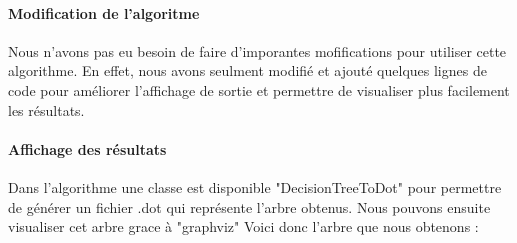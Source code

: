 \paragraph{Modification de l'algoritme}  
Nous n'avons pas eu besoin de faire d'imporantes mofifications pour utiliser cette algorithme. En effet, nous avons seulment modifié et ajouté quelques lignes de code pour améliorer l'affichage de sortie et permettre de visualiser plus facilement les résultats.

\paragraph{Affichage des résultats}
Dans l'algorithme une classe est disponible "DecisionTreeToDot" pour permettre de générer un fichier .dot qui représente l'arbre obtenus. Nous pouvons ensuite visualiser cet arbre grace à "graphviz"
Voici donc l'arbre que nous obtenons :

